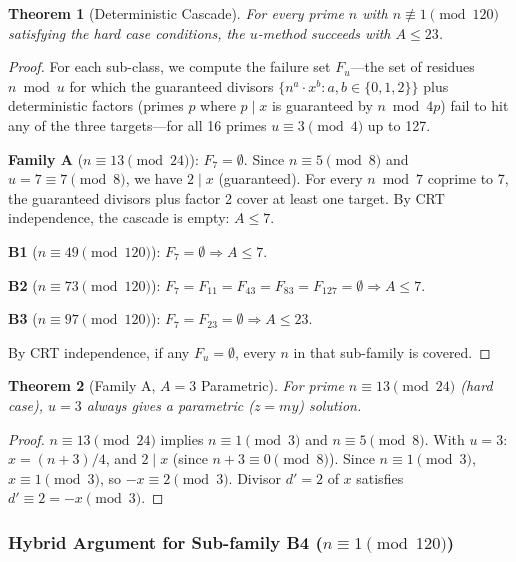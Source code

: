 \documentclass[11pt,a4paper]{article}
\theoremstyle{plain}
\newtheorem{theorem}{Theorem}[section]
\theoremstyle{plain}
\theoremstyle{definition}
\numberwithin{equation}{section}
\begin{document}
\begin{theorem}[Deterministic Cascade]\label{thm:cascade}
For every prime $n$ with $n \not\equiv 1 \pmod{120}$ satisfying the hard case conditions, the $u$-method succeeds with $A \leq 23$.
\end{theorem}

\begin{proof}
For each sub-class, we compute the failure set $F_u$---the set of residues $n \bmod u$ for which the guaranteed divisors $\{n^a \cdot x^b : a, b \in \{0,1,2\}\}$ plus deterministic factors (primes $p$ where $p \mid x$ is guaranteed by $n \bmod 4p$) fail to hit any of the three targets---for all 16 primes $u \equiv 3 \pmod{4}$ up to 127.

\textbf{Family A} ($n \equiv 13 \pmod{24}$): $F_7 = \emptyset$. Since $n \equiv 5 \pmod{8}$ and $u = 7 \equiv 7 \pmod{8}$, we have $2 \mid x$ (guaranteed). For every $n \bmod 7$ coprime to 7, the guaranteed divisors plus factor 2 cover at least one target. By CRT independence, the cascade is empty: $A \leq 7$.

\textbf{B1} ($n \equiv 49 \pmod{120}$): $F_7 = \emptyset \Rightarrow A \leq 7$.

\textbf{B2} ($n \equiv 73 \pmod{120}$): $F_7 = F_{11} = F_{43} = F_{83} = F_{127} = \emptyset \Rightarrow A \leq 7$.

\textbf{B3} ($n \equiv 97 \pmod{120}$): $F_7 = F_{23} = \emptyset \Rightarrow A \leq 23$.

By CRT independence, if any $F_u = \emptyset$, every $n$ in that sub-family is covered.
\end{proof}

\begin{theorem}[Family A, $A = 3$ Parametric]\label{thm:familyA}
For prime $n \equiv 13 \pmod{24}$ (hard case), $u = 3$ always gives a parametric ($z = my$) solution.
\end{theorem}

\begin{proof}
$n \equiv 13 \pmod{24}$ implies $n \equiv 1 \pmod{3}$ and $n \equiv 5 \pmod{8}$. With $u = 3$: $x = (n+3)/4$, and $2 \mid x$ (since $n + 3 \equiv 0 \pmod{8}$). Since $n \equiv 1 \pmod{3}$, $x \equiv 1 \pmod{3}$, so $-x \equiv 2 \pmod{3}$. Divisor $d' = 2$ of $x$ satisfies $d' \equiv 2 = -x \pmod{3}$.
\end{proof}

\subsubsection{Hybrid Argument for Sub-family B4 ($n \equiv 1 \pmod{120}$)}
\end{document}
